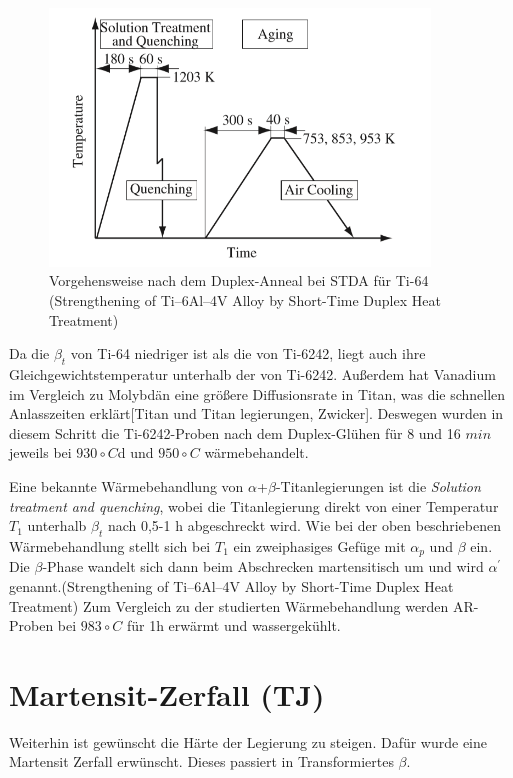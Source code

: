 \begin{figure}[H]
	\centering
	\includegraphics[width=0.9\textwidth]{Bilder/ts-stda}
	\caption{Vorgehensweise nach dem Duplex-Anneal bei STDA für Ti-64 (Strengthening of Ti–6Al–4V Alloy by Short-Time Duplex Heat Treatment)}
	\label{STDA}
\end{figure}

Da die $\beta_{t}$ von Ti-64 niedriger ist als die von Ti-6242, liegt auch ihre Gleichgewichtstemperatur unterhalb der von Ti-6242. Außerdem hat Vanadium im Vergleich zu Molybdän eine größere Diffusionsrate in Titan, was die schnellen Anlasszeiten erklärt[Titan und Titan legierungen, Zwicker]. Deswegen wurden in diesem Schritt die Ti-6242-Proben nach dem Duplex-Glühen für 8 und 16 $min$ jeweils bei $930\circ C$d und $950\circ C$ wärmebehandelt.

Eine bekannte Wärmebehandlung von $\alpha$+$\beta$-Titanlegierungen ist die  \textit{Solution treatment and quenching}, wobei die Titanlegierung direkt von einer Temperatur $T_{1}$ unterhalb  $\beta_{t}$ nach 0,5-1 h abgeschreckt wird. Wie bei der oben beschriebenen Wärmebehandlung stellt sich bei $T_{1}$ ein zweiphasiges Gefüge mit $\alpha_p$ und $\beta$ ein. Die $\beta$-Phase wandelt sich  dann beim Abschrecken martensitisch um und wird $\alpha^\prime$ genannt.(Strengthening of Ti–6Al–4V Alloy by Short-Time Duplex Heat Treatment)
Zum Vergleich zu der studierten Wärmebehandlung werden AR-Proben bei $983 \circ C$ für 1h erwärmt und wassergekühlt.

\section{Martensit-Zerfall (TJ)}

Weiterhin ist gewünscht die Härte der Legierung zu steigen. Dafür wurde eine Martensit Zerfall erwünscht. Dieses passiert in Transformiertes $\beta$. 

